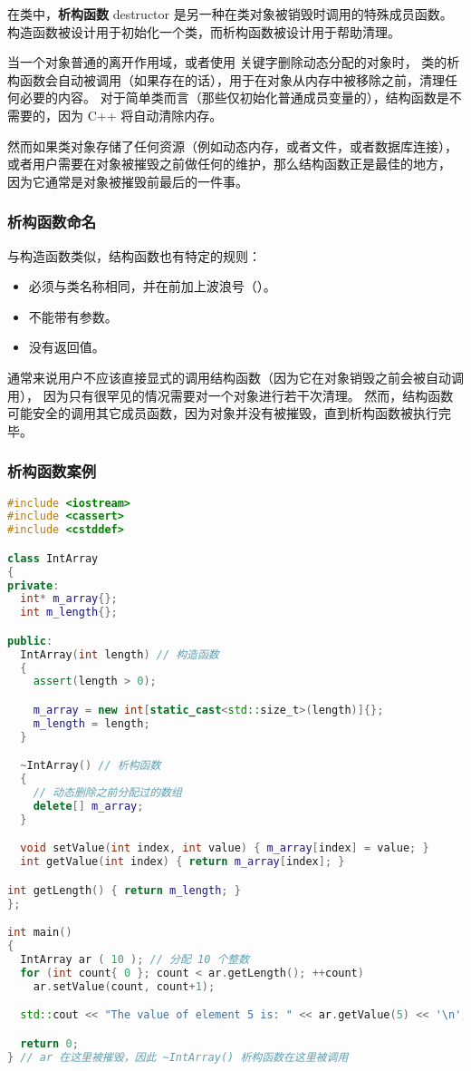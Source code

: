 \documentclass[../../LearnCpp.tex]{subfiles}
\begin{document}

在类中，\textbf{析构函数} destructor 是另一种在类对象被销毁时调用的特殊成员函数。
构造函数被设计用于初始化一个类，而析构函数被设计用于帮助清理。

当一个对象普通的离开作用域，或者使用  关键字删除动态分配的对象时，
类的析构函数会自动被调用（如果存在的话），用于在对象从内存中被移除之前，清理任何必要的内容。
对于简单类而言（那些仅初始化普通成员变量的），结构函数是不需要的，因为 C++ 将自动清除内存。

然而如果类对象存储了任何资源（例如动态内存，或者文件，或者数据库连接），
或者用户需要在对象被摧毁之前做任何的维护，那么结构函数正是最佳的地方，
因为它通常是对象被摧毁前最后的一件事。

\subsubsection*{析构函数命名}

与构造函数类似，结构函数也有特定的规则：

\begin{itemize}
  \item 必须与类名称相同，并在前加上波浪号（\acode{\~}）。
  \item 不能带有参数。
  \item 没有返回值。
\end{itemize}

通常来说用户不应该直接显式的调用结构函数（因为它在对象销毁之前会被自动调用），
因为只有很罕见的情况需要对一个对象进行若干次清理。
然而，结构函数可能安全的调用其它成员函数，因为对象并没有被摧毁，直到析构函数被执行完毕。

\subsubsection*{析构函数案例}

\begin{lstlisting}[language=C++]
#include <iostream>
#include <cassert>
#include <cstddef>

class IntArray
{
private:
  int* m_array{};
  int m_length{};

public:
  IntArray(int length) // 构造函数
  {
    assert(length > 0);

    m_array = new int[static_cast<std::size_t>(length)]{};
    m_length = length;
  }

  ~IntArray() // 析构函数
  {
    // 动态删除之前分配过的数组
    delete[] m_array;
  }

  void setValue(int index, int value) { m_array[index] = value; }
  int getValue(int index) { return m_array[index]; }

int getLength() { return m_length; }
};

int main()
{
  IntArray ar ( 10 ); // 分配 10 个整数
  for (int count{ 0 }; count < ar.getLength(); ++count)
    ar.setValue(count, count+1);

  std::cout << "The value of element 5 is: " << ar.getValue(5) << '\n';

  return 0;
} // ar 在这里被摧毁，因此 ~IntArray() 析构函数在这里被调用
\end{lstlisting}
\end{document}
